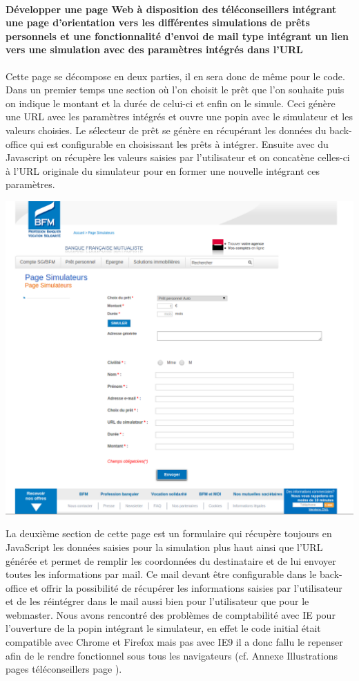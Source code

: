 \documentclass[a4paper,11pt,twoside]{report}
\begin{document}
      \paragraph*{Développer une page Web à disposition des téléconseillers intégrant une page d’orientation vers les différentes simulations de prêts personnels et une fonctionnalité d’envoi de mail type intégrant un lien vers une simulation avec des paramètres intégrés dans l’URL}
      Cette page se décompose en deux parties, il en sera donc de même pour le code. Dans un premier temps une section où l'on choisit le prêt que l'on souhaite puis on indique le montant et la durée de celui-ci et enfin on le simule. Ceci génère une URL avec les paramètres intégrés et ouvre une popin avec le simulateur et les valeurs choisies. Le sélecteur de prêt se génère en récupérant les données du back-office qui est configurable en choisissant les prêts à intégrer. Ensuite avec du Javascript on récupère les valeurs saisies par l'utilisateur et on concatène celles-ci à l'URL originale du simulateur pour en former une nouvelle intégrant ces paramètres. 
      \begin{center}
	\includegraphics[width=\textwidth]{images/page_teleconseille1.png}  
	\label{page_teleconseille_formulaire}
      \end{center}
      La deuxième section de cette page est un formulaire qui récupère toujours en JavaScript les données saisies pour la simulation plus haut ainsi que l'URL générée et permet de remplir les coordonnées du destinataire et de lui envoyer toutes les informations par mail. Ce mail devant être configurable dans le back-office et offrir la possibilité de récupérer les informations saisies par l'utilisateur et de les réintégrer dans le mail aussi bien pour l'utilisateur que pour le webmaster. 
      Nous avons rencontré des problèmes de comptabilité avec IE pour l'ouverture de la popin intégrant le simulateur, en effet le code initial était compatible avec Chrome et Firefox mais pas avec IE9 il a donc fallu le repenser afin de le rendre fonctionnel sous tous les navigateurs (cf. Annexe Illustrations pages téléconseillers page \pageref{illustrations_pages_teleconseillers}).
\end{document}
